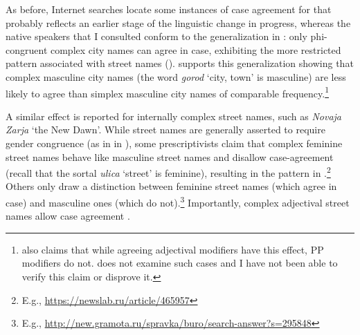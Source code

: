 \documentclass[output=paper,colorlinks,citecolor=brown]{langscibook}
\begin{document}
\ea\label{mat:ex:BelayaCerkov-PetropavlovskKamcatskij}
\z
\z

\noindent As before, Internet searches locate some instances of case agreement for  that probably reflects an earlier stage of the linguistic change in progress, where\-as the native speakers that I consulted conform to the generalization in \citet{GraudinaKatlinskaja1976}: only phi-congruent complex city names can agree in case, exhibiting the more restricted pattern associated with street names (). \citet{Logvinova2018} supports this generalization showing that complex masculine city names (the word \textit{gorod} ‘city, town’ is masculine) are less likely to agree than simplex masculine city names of comparable frequency.\footnote{\citet[149]{GraudinaKatlinskaja1976} also claims that while agreeing adjectival modifiers have this effect, PP modifiers do not. \citet{Logvinova2018} does not examine such cases and I have not been able to verify this claim or disprove it.}

A similar effect is reported for internally complex street names, such as \textit{Novaja Zarja} ‘the New Dawn’. While street names are generally asserted to require gender congruence (as in  in ), some prescriptivists claim that complex feminine street names behave like masculine street names and disallow case-agreement (recall that the sortal \textit{ulica} ‘street’ is feminine), resulting in the pattern in .\footnote{E.g., \url{https://newslab.ru/article/465957}} Others only draw a distinction between feminine street names (which agree in case) and masculine ones (which do not).\footnote{E.g., \url{http://new.gramota.ru/spravka/buro/search-answer?s=295848}} Importantly, complex adjectival street names allow case agreement .
\end{document}
